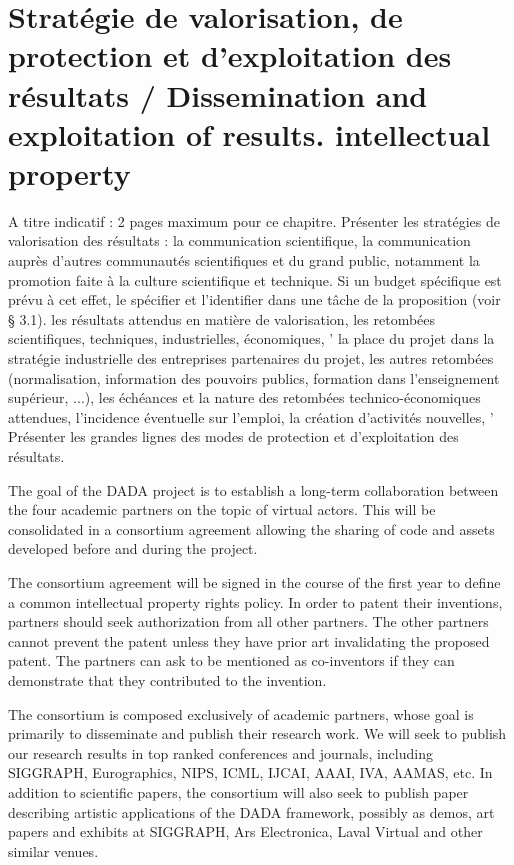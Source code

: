


\section{Strat\'egie de valorisation, de protection et d'exploitation des r\'esultats / Dissemination and exploitation of results. intellectual property}
\begin{xcomment}   
A titre indicatif : 2 pages maximum pour ce chapitre.
Pr\'esenter les strat\'egies de valorisation des r\'esultats :
la communication scientifique,
la communication aupr\`es d'autres communaut\'es scientifiques et du grand public, notamment la promotion faite à la culture scientifique et technique. Si un budget sp\'ecifique est pr\'evu à cet effet, le sp\'ecifier et l'identifier dans une tâche de la proposition (voir § 3.1).
les r\'esultats attendus en mati\`ere de valorisation,
les retomb\'ees scientifiques, techniques, industrielles, \'economiques, '
la place du projet dans la strat\'egie industrielle des entreprises partenaires du projet,
les autres retomb\'ees (normalisation, information des pouvoirs publics, formation dans l'enseignement sup\'erieur, ...),
les \'ech\'eances et la nature des retomb\'ees technico-\'economiques attendues,
l'incidence \'eventuelle sur l'emploi, la cr\'eation d'activit\'es nouvelles, '
Pr\'esenter les grandes lignes des modes de protection et d'exploitation des r\'esultats.
\end{xcomment}

The goal of the DADA project is to establish a long-term collaboration between the four academic partners on the topic of virtual actors. This
will be consolidated in a consortium agreement allowing the sharing of code and assets developed before and during the project.

The consortium agreement will be signed in the course of the first year to define a common  intellectual property rights policy. In order to 
patent their inventions, partners should seek authorization from all other partners.  The other partners cannot prevent the patent unless they 
have prior art invalidating the proposed patent. The partners  can ask to be mentioned as co-inventors if they can demonstrate that they contributed 
to the invention.

The consortium is composed exclusively of academic partners, whose goal is primarily  to disseminate and publish their research work. We will seek to publish our research results in top ranked conferences and journals, including SIGGRAPH, Eurographics, NIPS, ICML, IJCAI, AAAI, IVA, AAMAS, etc. In addition to scientific papers, the consortium will also seek to publish paper describing  artistic applications of the DADA framework, possibly as demos, art papers and exhibits at SIGGRAPH, Ars Electronica, Laval Virtual and other similar venues. 

